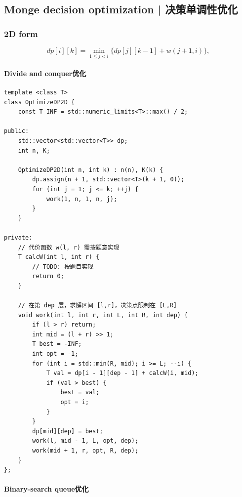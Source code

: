 
\subsection{Monge decision optimization | 决策单调性优化}

    \subsubsection{2D form}
        \[
            dp[i][k] = \min_{1 \le j < i} \{ dp[j][k-1] + w(j+1,i) \},
        \]

        \paragraph{Divide and conquer优化}

        \begin{lstlisting}
template <class T>
class OptimizeDP2D {
    const T INF = std::numeric_limits<T>::max() / 2;

public:
    std::vector<std::vector<T>> dp;
    int n, K;

    OptimizeDP2D(int n, int k) : n(n), K(k) {
        dp.assign(n + 1, std::vector<T>(k + 1, 0));
        for (int j = 1; j <= k; ++j) {
            work(1, n, 1, n, j);
        }
    }

private:
    // 代价函数 w(l, r) 需按题意实现
    T calcW(int l, int r) {
        // TODO: 按题目实现
        return 0;
    }

    // 在第 dep 层，求解区间 [l,r]，决策点限制在 [L,R]
    void work(int l, int r, int L, int R, int dep) {
        if (l > r) return;
        int mid = (l + r) >> 1;
        T best = -INF;
        int opt = -1;
        for (int i = std::min(R, mid); i >= L; --i) {
            T val = dp[i - 1][dep - 1] + calcW(i, mid);
            if (val > best) {
                best = val;
                opt = i;
            }
        }
        dp[mid][dep] = best;
        work(l, mid - 1, L, opt, dep);
        work(mid + 1, r, opt, R, dep);
    }
};
        \end{lstlisting}

        \paragraph{Binary-search queue优化}

